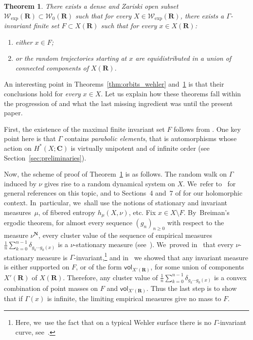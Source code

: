 \documentclass[JEP,XML,SOM,Unicode,published]{cedram}
\newenvironment{enumeratea}
{\bgroup\def\theenumi{\alph{enumi}}\begin{enumerate}}
{\end{enumerate}\egroup}
\newcommand{\unsur}[1]{\frac{1}{#1}}
\def\C{\mathbf{C}}
\def\R{\mathbf{R}}
\def\N{\mathbf{N}}
\newcommand{\cW}{\mathcal{W}}
\newcommand{\vol}{{\mathsf{vol}}}
\theoremstyle{plain}
\newtheorem{thm}{Theorem}[section]
\theoremstyle{definition}
\begin{document}
\begin{thm}\label{thm:equidistribution_wehler}
There exists a dense
and Zariski open subset $ \cW_{\mathrm{exp}}(\R)\subset \cW_0(\R)$
such that for {every} $X\in \cW_{\mathrm{exp}}(\R)$, there exists
a $\Gamma$-invariant finite set $F\subset X(\R)$ such that for {every} $x\in X(\R)$:
\begin{enumeratea}
\item\label{thm:equidistribution_wehlera} either $x\in F$;
\item\label{thm:equidistribution_wehlerb} or the random trajectories starting at $x$ are equidistributed in a union of connected components of $X(\R)$.
\end{enumeratea}
\end{thm}

An interesting point in Theorems~\ref{thm:orbits_wehler} and~\ref{thm:equidistribution_wehler} is that their
conclusions hold for \emph{every} $x\in X$. Let us explain how these theorems fall within
the progression of \cite{stiffness, finite_orbits, invariant} and what the last missing ingredient was until the present paper.

First, the existence of the maximal finite invariant set $F$ follows from \cite[Th.\,C]{finite_orbits}. One key point here is that $\Gamma$ contains \emph{parabolic elements}, that is automorphisms whose
action on $H^*(X;\C)$ is virtually unipotent and
of infinite order (see Section~\ref{sec:preliminaries}).

Now, the scheme of proof of Theorem~\ref{thm:equidistribution_wehler} is as follows.
The random walk on $\Gamma$ induced by $\nu$ gives rise to a random dynamical system on $X$. We~refer to~\cite{Kifer, br} for general references on this topic,
and to Sections~4 and~7 of \cite{stiffness} for our holomorphic context. In~particular, we~shall use the notions of stationary and invariant measures~$\mu$, of fibered entropy $h_\mu(X,\nu)$, etc.
Fix $x\in X\setminus F$. By~Breiman's ergodic theorem, for almost every sequence $(g_n)_{n\geq 0}$ with respect to the measure $\nu^\N$,
every cluster value of the sequence of
empirical measures
$\unsur{n} \sum_{k=0}^{n-1} \delta_{g_k\cdots g_0(x)}$ is a $\nu$-stationary measure (see~\cite[\S 2.2]{benoist-quint_book}). We~proved in~\cite{stiffness} that every $\nu$-stationary measure is $\Gamma$-invariant,\footnote{Here, we~use the fact that on
a typical Wehler surface there is no $\Gamma$-invariant curve, see~\cite[Lem.\,2.3]{finite_orbits}.}
and in~\cite{invariant} we showed that any invariant measure is either supported on $F$, or of the
form $\vol_{X'(\R)}$, for some union of components $X'(\R)$ of $X(\R)$. Therefore, any cluster value of
$\unsur{n} \sum_{k=0}^{n-1} \delta_{g_k\cdots g_0(x)}$ is a convex combination of point masses on $F$ and
$\vol_{X'(\R)}$. Thus the last step is to show that if $\Gamma(x)$ is infinite, the limiting empirical
measures give no mass to $F$.
\end{document}
